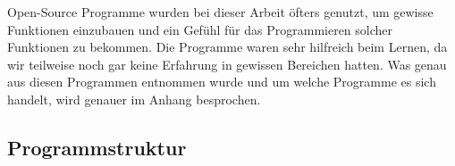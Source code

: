 \documentclass[a4paper,11pt]{article}
\begin{document}
Open-Source Programme wurden bei dieser Arbeit öfters genutzt, um gewisse Funktionen einzubauen und ein Gefühl für das Programmieren solcher Funktionen zu bekommen. Die Programme
waren sehr 
hilfreich beim Lernen, da wir teilweise noch gar keine Erfahrung in gewissen Bereichen hatten. Was genau aus diesen Programmen entnommen wurde und um welche Programme es sich handelt, wird 
genauer im Anhang besprochen. 



\subsection{Programmstruktur}

\end{document}
